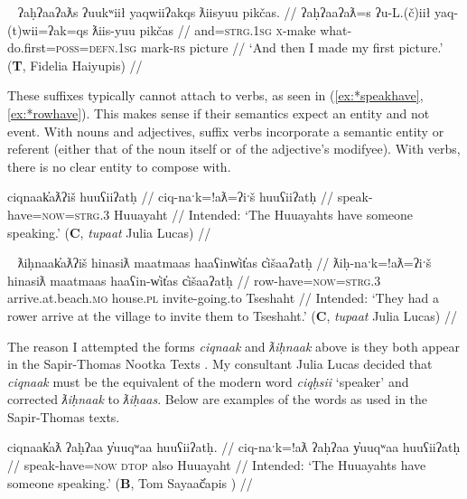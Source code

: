 \begin{comment}
\ex \label{ex:mightnotgive}
\begingl
\glpreamble wikcumʔick huʔayi siičił waaʔaƛ. //
\gla wik-cum=ʔick huʔa-ayiˑ si-L.(č)ił waa=!aƛ //
\glb \textsc{neg}-might=\textsc{real.2sg} back-give \textsc{1sg}-\textsc{do.to} say=\textsc{now} //
\glft ` ``You might not give it back," he said.' (\textbf{C}, \textit{tupaat} Julia Lucas) //
\endgl
\xe
\end{comment}

\ex~ \label{ex:mightnotgive}
\begingl
\glpreamble ʔaḥʔaaʔaƛs ʔuukʷiił yaqwiiʔakqs ƛiisyuu pikčas. //
\gla ʔaḥʔaaʔaƛ=s ʔu-L.(č)iił yaq-(t)wii=ʔak=qs ƛiis-yuu pikčas //
\glb and=\textsc{strg.1sg} \textsc{x}-make what-do.first=\textsc{poss}=\textsc{defn.1sg} mark-\textsc{rs} picture //
\glft `And then I made my first picture.' (\textbf{T}, Fidelia Haiyupis) //
\endgl
\xe

These suffixes typically cannot attach to verbs, as seen in (\ref{ex:*speakhave}, \ref{ex:*rowhave}). This makes sense if their semantics expect an entity and not event. With nouns and adjectives, suffix verbs incorporate a semantic entity or referent (either that of the noun itself or of the adjective's modifyee). With verbs, there is no clear entity to compose with.

\ex \label{ex:*speakhave}
\begingl
\glpreamble *ciqnaak̓aƛʔiš huuʕiiʔatḥ //
\gla ciq-naˑk=!aƛ=ʔiˑš huuʕiiʔatḥ //
\glb speak-have=\textsc{now}=\textsc{strg.3} Huuayaht //
\glft Intended: `The Huuayahts have someone speaking.' (\textbf{C}, \textit{tupaat} Julia Lucas) //
\endgl
\xe

\ex~ \label{ex:*rowhave}
\begingl
\glpreamble *ƛiḥnaak̓aƛʔiš hinasiƛ maatmaas haaʕinw̓it̓as c̓išaaʔatḥ //
\gla ƛiḥ-naˑk=!aƛ=ʔiˑš hinasiƛ maatmaas haaʕin-w̓it̓as c̓išaaʔatḥ //
\glb row-have=\textsc{now}=\textsc{strg.3} arrive.at.beach.\textsc{mo} house.\textsc{pl} invite-going.to Tseshaht //
\glft Intended: `They had a rower arrive at the village to invite them to Tseshaht.' (\textbf{C}, \textit{tupaat} Julia Lucas) //
\endgl
\xe

The reason I attempted the forms \textit{ciqnaak} and \textit{ƛiḥnaak} above is they both appear in the Sapir-Thomas Nootka Texts \citep{sapir1939, sapir1955}. My consultant Julia Lucas decided that \textit{ciqnaak} must be the equivalent of the modern word \textit{ciqḥsii} `speaker' and corrected \textit{ƛiḥnaak} to \textit{ƛiḥaas}. Below are examples of the words as used in the Sapir-Thomas texts.

\ex \label{ex:speakhave}
\begingl
\glpreamble ciqnaak̓aƛ ʔaḥʔaa y̓uuqʷaa huuʕiiʔatḥ. //
\gla ciq-naˑk=!aƛ ʔaḥʔaa y̓uuqʷaa huuʕiiʔatḥ //
\glb speak-have=\textsc{now} \textsc{dtop} also Huuayaht //
\glft Intended: `The Huuayahts have someone speaking.' (\textbf{B}, Tom Sayaač̓apis \citealt[p.~169]{sapir1955}) //
\endgl
\xe

